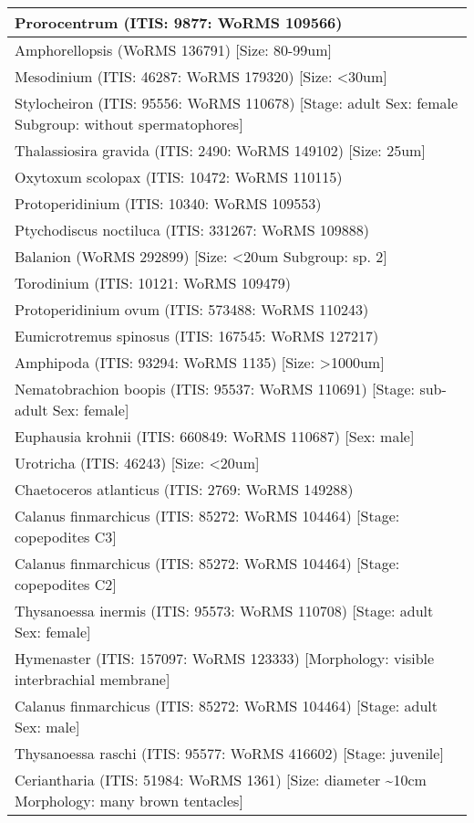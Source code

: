 \documentclass[
]{book}
\begin{document}
\begin{tabular}[t]{l}
Prorocentrum (ITIS: 9877: WoRMS 109566)\\
\hline
Amphorellopsis (WoRMS 136791) [Size: 80-99um]\\
\hline
Mesodinium (ITIS: 46287: WoRMS 179320) [Size: <30um]\\
\hline
Stylocheiron (ITIS: 95556: WoRMS 110678) [Stage: adult Sex: female Subgroup: without spermatophores]\\
\hline
Thalassiosira gravida (ITIS: 2490: WoRMS 149102) [Size: 25um]\\
\hline
Oxytoxum scolopax (ITIS: 10472: WoRMS 110115)\\
\hline
Protoperidinium (ITIS: 10340: WoRMS 109553)\\
\hline
Ptychodiscus noctiluca (ITIS: 331267: WoRMS 109888)\\
\hline
Balanion (WoRMS 292899) [Size: <20um Subgroup: sp. 2]\\
\hline
Torodinium (ITIS: 10121: WoRMS 109479)\\
\hline
Protoperidinium ovum (ITIS: 573488: WoRMS 110243)\\
\hline
Eumicrotremus spinosus (ITIS: 167545: WoRMS 127217)\\
\hline
Amphipoda (ITIS: 93294: WoRMS 1135) [Size: >1000um]\\
\hline
Nematobrachion boopis (ITIS: 95537: WoRMS 110691) [Stage: sub-adult Sex: female]\\
\hline
Euphausia krohnii (ITIS: 660849: WoRMS 110687) [Sex: male]\\
\hline
Urotricha (ITIS: 46243) [Size: <20um]\\
\hline
Chaetoceros atlanticus (ITIS: 2769: WoRMS 149288)\\
\hline
Calanus finmarchicus (ITIS: 85272: WoRMS 104464) [Stage: copepodites C3]\\
\hline
Calanus finmarchicus (ITIS: 85272: WoRMS 104464) [Stage: copepodites C2]\\
\hline
Thysanoessa inermis (ITIS: 95573: WoRMS 110708) [Stage: adult Sex: female]\\
\hline
Hymenaster (ITIS: 157097: WoRMS 123333) [Morphology: visible interbrachial membrane]\\
\hline
Calanus finmarchicus (ITIS: 85272: WoRMS 104464) [Stage: adult Sex: male]\\
\hline
Thysanoessa raschi (ITIS: 95577: WoRMS 416602) [Stage: juvenile]\\
\hline
Ceriantharia (ITIS: 51984: WoRMS 1361) [Size: diameter \textasciitilde{}10cm Morphology: many brown tentacles]\\

\end{tabular}
\end{document}
